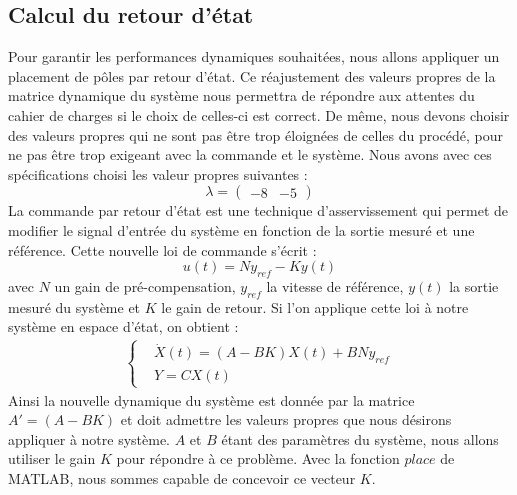 \subsection{Calcul du retour d'état}
\label{sub:Calcul du retour etat}
Pour garantir les performances dynamiques souhaitées, nous allons appliquer un placement de pôles par retour d'état. Ce réajustement des valeurs propres de la matrice dynamique du système nous permettra de répondre aux attentes du cahier de charges si le choix de celles-ci est correct. De même, nous devons choisir des valeurs propres qui ne sont pas être trop éloignées de celles du procédé, pour ne pas être trop exigeant avec la commande et le système. Nous avons avec ces spécifications choisi les valeur propres suivantes :
\begin{equation}
\label{equation:valeurPropres}
\lambda = \begin{pmatrix}
-8 &-5
\end{pmatrix}
\end{equation}
La commande par retour d'état est une technique d'asservissement qui permet de modifier le signal d'entrée du système en fonction de la sortie mesuré et une référence. Cette nouvelle loi de commande s'écrit : 
\begin{equation}
u(t) = Ny_{ref}-Ky(t)
\end{equation} avec $N$ un gain de pré-compensation, $y_{ref}$ la vitesse de référence, $y(t)$ la sortie mesuré du système et $K$ le gain de retour. Si l'on applique cette loi à notre système en espace d'état, on obtient : 
\begin{align*}
\left\lbrace
\begin{aligned}
&\dot{X}(t) = (A-BK)X(t) + BNy_{ref}\\
&Y = CX(t)
\end{aligned}
\right.
\end{align*}
Ainsi la nouvelle dynamique du système est donnée par la matrice $A' = (A-BK)$ et doit admettre les valeurs propres que nous désirons appliquer à notre système. $A$ et $B$ étant des paramètres du système, nous allons utiliser le gain $K$ pour répondre à ce problème. Avec la fonction $place$ de MATLAB, nous sommes capable de concevoir ce vecteur $K$. 

